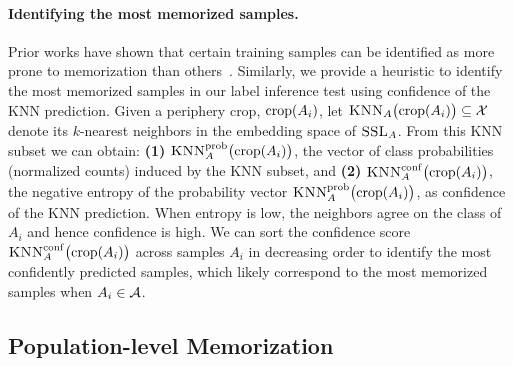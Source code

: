 \paragraph{Identifying the most memorized samples.} Prior works have shown that certain training samples can be identified as more prone to memorization than others~\citep{feldman2020does, watson2021importance, ye2021enhanced}. Similarly, we provide a heuristic to identify the most memorized samples in our label inference test using confidence of the KNN prediction.
Given a periphery crop, $\mathrm{crop}({A_i})$, let $\textsc{KNN}_A \big( \mathrm{crop}({A_i}) \big) \subseteq \mathcal{X}$ denote its $k$-nearest neighbors in the embedding space of $\textsc{SSL}_A$. From this KNN subset we can obtain: \textbf{(1)} $\textsc{KNN}^\mathrm{prob}_A \big( \mathrm{crop}({A_i}) \big)$, the vector of class probabilities (normalized counts) induced by the KNN subset, and \textbf{(2)} $\textsc{KNN}^\mathrm{conf}_A \big( \mathrm{crop}({A_i}) \big)$, the negative entropy of the probability vector $\textsc{KNN}^\mathrm{prob}_A \big( \mathrm{crop}({A_i}) \big)$, as confidence of the KNN prediction. When entropy is low, the neighbors agree on the class of $A_i$ and hence confidence is high. 
We can sort the confidence score $\textsc{KNN}^\mathrm{conf}_A \big( \mathrm{crop}({A_i}) \big)$ across samples $A_i$ in decreasing order to identify the most confidently predicted samples, which likely correspond to the most memorized samples when $A_i \in \mathcal{A}$.

\subsection{Population-level Memorization}
\label{sec:label inference accuracy}

% 
% 
% 

